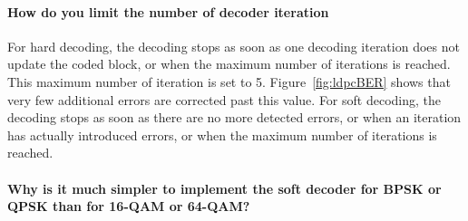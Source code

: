 \paragraph{How do you limit the number of decoder iteration}
For hard decoding, the decoding stops as soon as one decoding iteration does not update the coded block, or when the maximum number of iterations is reached. This maximum number of iteration is set to 5. Figure~\ref{fig:ldpcBER} shows that very few additional errors are corrected past this value.
For soft decoding, the decoding stops as soon as there are no more detected errors, or when an iteration has actually introduced errors, or when the maximum number of iterations is reached.

\paragraph{Why is it much simpler to implement the soft decoder for BPSK or QPSK than for 16-QAM or 64-QAM?}